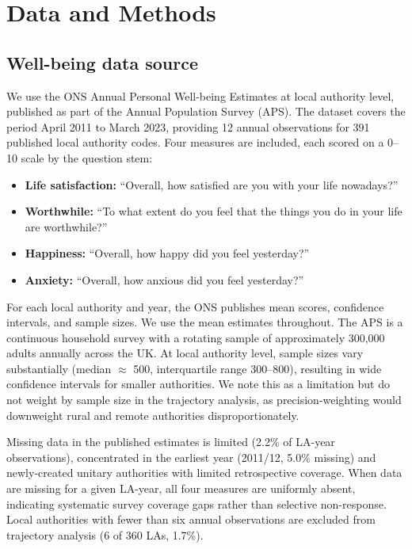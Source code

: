 \documentclass[12pt,a4paper]{article}
\begin{document}
\section{Data and Methods}

\subsection{Well-being data source}

We use the ONS Annual Personal Well-being Estimates at local authority level, published as part of the Annual Population Survey (APS). The dataset covers the period April 2011 to March 2023, providing 12 annual observations for 391 published local authority codes. Four measures are included, each scored on a 0--10 scale by the question stem:

\begin{itemize}
\item \textbf{Life satisfaction:} ``Overall, how satisfied are you with your life nowadays?''
\item \textbf{Worthwhile:} ``To what extent do you feel that the things you do in your life are worthwhile?''
\item \textbf{Happiness:} ``Overall, how happy did you feel yesterday?''
\item \textbf{Anxiety:} ``Overall, how anxious did you feel yesterday?''
\end{itemize}

For each local authority and year, the ONS publishes mean scores, confidence intervals, and sample sizes. We use the mean estimates throughout. The APS is a continuous household survey with a rotating sample of approximately 300,000 adults annually across the UK. At local authority level, sample sizes vary substantially (median $\approx$ 500, interquartile range 300--800), resulting in wide confidence intervals for smaller authorities. We note this as a limitation but do not weight by sample size in the trajectory analysis, as precision-weighting would downweight rural and remote authorities disproportionately.

Missing data in the published estimates is limited (2.2\% of LA-year observations), concentrated in the earliest year (2011/12, 5.0\% missing) and newly-created unitary authorities with limited retrospective coverage. When data are missing for a given LA-year, all four measures are uniformly absent, indicating systematic survey coverage gaps rather than selective non-response. Local authorities with fewer than six annual observations are excluded from trajectory analysis (6 of 360 LAs, 1.7\%).
\end{document}
